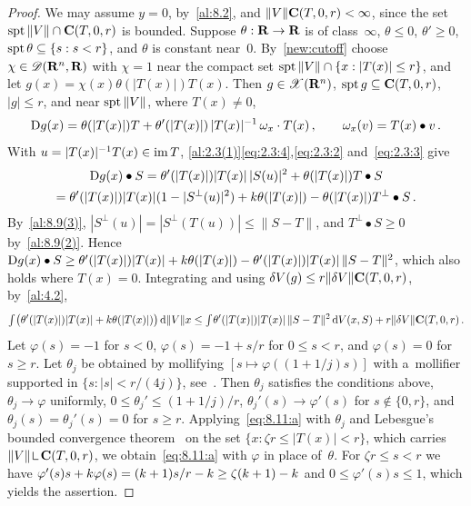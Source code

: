 \begin{proof}
    We may assume $y = 0$, by~\ref{al:8.2}, and $\|V\| \mathbf{C} ( T, 0, r ) < \infty$, since the set
    $\operatorname{spt} \|V\| \cap \mathbf{C} ( T, 0, r )$ is bounded. Suppose $\theta : \mathbf{R} \to \mathbf{R}$ is of class~$\infty$,
    $\theta \le 0$, $\theta' \ge 0$, $\operatorname{spt} \theta \subseteq \{ s : s < r \}$, and $\theta$ is
    constant near~$0$. By~\ref{new:cutoff} choose $\chi \in \mathscr{D}(\mathbf{R}^{n},\mathbf{R})$ with $\chi = 1$
    near the compact set $\operatorname{spt} \|V\| \cap \{ x : |T(x)| \le r \}$, and let $g(x) = \chi(x)
    \theta(|T(x)|) T(x)$. Then $g \in \mathscr{X}(\mathbf{R}^{n})$, $\operatorname{spt} g \subseteq \mathbf{C} ( T, 0, r )$, $|g| \le
    r$, and near $\operatorname{spt} \|V\|$, where $T(x) \ne 0$,
    \begin{displaymath}
        \mathrm{D} g(x) = \theta(|T(x)|) T + \theta'(|T(x)|) \, |T(x)|^{-1} \, \omega_x \cdot T(x) \,,
        \qquad \omega_x(v) = T(x) \bullet v \,.
    \end{displaymath}
    With $u = |T(x)|^{-1} T(x) \in \operatorname{im} T$, \ref{al:2.3(1)}\eqref{eq:2.3:4},\eqref{eq:2.3:2}
    and~\eqref{eq:2.3:3} give
    \begin{multline*}
        \mathrm{D} g(x) \bullet S = \theta'(|T(x)|) |T(x)| \, |S(u)|^2 + \theta(|T(x)|) T \bullet S \\ =
        \theta'(|T(x)|) |T(x)| (1 - |S^\perp(u)|^2) + k \theta(|T(x)|) - \theta(|T(x)|) T^\perp
        \bullet S \,.
    \end{multline*}
    By~\ref{al:8.9(3)}, $|S^\perp(u)| = |S^\perp(T(u))| \le \|S - T\|$, and $T^\perp \bullet S \ge
    0$ by~\ref{al:8.9(2)}. Hence $\mathrm{D} g(x) \bullet S \ge \theta'(|T(x)|) |T(x)| + k
    \theta(|T(x)|) - \theta'(|T(x)|) |T(x)| \, \|S - T\|^2$, which also holds where $T(x) = 0$.
    Integrating and using $\delta V(g) \le r \|\delta V\| \mathbf{C} ( T, 0, r )$, by~\ref{al:4.2},
    \begin{equation}
        \label{eq:8.11:a}
        {\textstyle\int_{}^{}} \big( \theta'(|T(x)|) |T(x)| + k \theta(|T(x)|) \big) \,\mathrm{d} \|V\| x \le
        {\textstyle\int_{}^{}} \theta'(|T(x)|) |T(x)| \, \|S - T\|^2 \,\mathrm{d} V(x,S) + r \|\delta V\|
        \mathbf{C} ( T, 0, r ) \,.
    \end{equation}
    Let $\varphi(s) = -1$ for $s < 0$, $\varphi(s) = -1 + s/r$ for $0 \le s < r$, and $\varphi(s) = 0$
    for $s \ge r$. Let $\theta_j$ be obtained by mollifying $[s \mapsto \varphi((1 + 1/j) s)]$ with
    a~mollifier supported in $\{ s : |s| < r/(4j) \}$, see~\cite[4.1.2]{Federer1969}. Then
    $\theta_j$ satisfies the conditions above, $\theta_j \to \varphi$ uniformly, $0 \le \theta_j'
    \le (1 + 1/j) / r$, $\theta_j'(s) \to \varphi'(s)$ for $s \notin \{ 0, r \}$, and $\theta_j(s) =
    \theta_j'(s) = 0$ for $s \ge r$. Applying~\eqref{eq:8.11:a} with $\theta_j$ and Lebesgue's
    bounded convergence theorem~\cite[2.4.9]{Federer1969} on the set $\{ x : \zeta r \le |T(x)| < r
    \}$, which carries $\|V\| \restrict \cylind{T}{0}{r}$, we obtain~\eqref{eq:8.11:a} with $\varphi$
    in place of~$\theta$. For $\zeta r \le s < r$ we have $\varphi'(s) s + k \varphi(s) = (k +
    1) s/r - k \ge \zeta(k+1) - k$ and $0 \le \varphi'(s) s \le 1$, which yields the
    assertion.
\end{proof}

